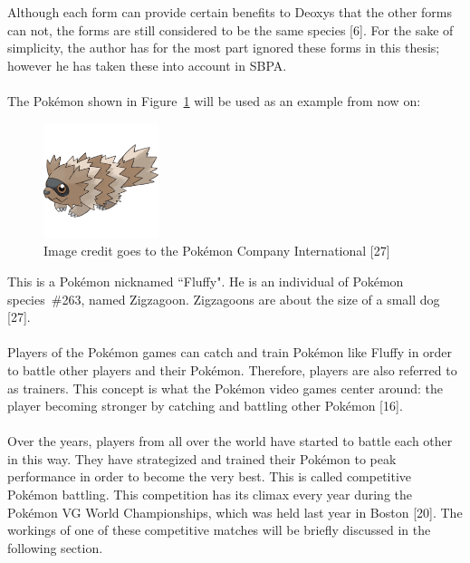 \documentclass{article}
\begin{document}
Although each form can provide certain benefits to Deoxys that the other forms can not, the forms are still considered to be the same species [6]. For the sake of simplicity, the author has for the most part ignored these forms in this thesis; however he has taken these into account in SBPA.\\\\
The Pok\'emon shown in Figure~\ref{fluffypic} will be used as an example from now on:
\begin{figure}[H]
	\includegraphics[width=0.30\textwidth]{fluffy.png}
	\centering
	\caption{Image credit goes to the Pok\'emon Company International [27]}\label{fluffypic}
\end{figure}
This is a Pok\'emon nicknamed ``Fluffy". He is an individual of Pok\'emon species~\#263, named Zigzagoon. Zigzagoons are about the size of a small dog [27].\\\\
Players of the Pok\'emon games can catch and train Pok\'emon like Fluffy in order to battle other players and their Pok\'emon. Therefore, players are also referred to as trainers. This concept is what the Pok\'emon video games center around: the player becoming stronger by catching and battling other Pok\'emon [16].\\\\
Over the years, players from all over the world have started to battle each other in this way. They have strategized and trained their Pok\'emon to peak performance in order to become the very best. This is called competitive Pok\'emon battling. This competition has its climax every year during the Pok\'emon VG World Championships, which was held last year in Boston [20].
The workings of one of these competitive matches will be briefly discussed in the following section.
\end{document}
